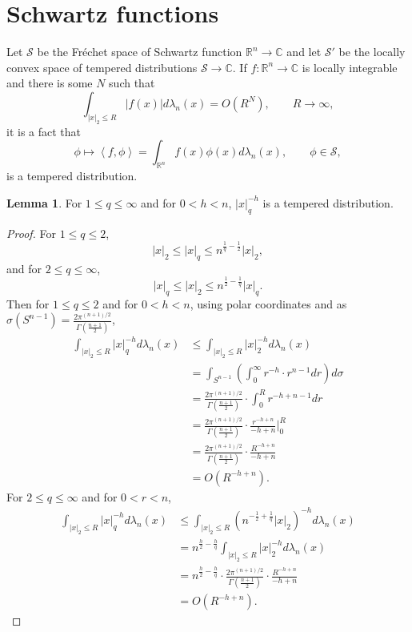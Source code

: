 \documentclass{article}
\newcommand{\inner}[2]{\left\langle #1, #2 \right\rangle}
\theoremstyle{definition}
\newtheorem{lemma}[theorem]{Lemma}
\theoremstyle{definition}
\begin{document}
\section{Schwartz functions}
Let $\mathscr{S}$ be the Fr\'echet space of Schwartz function $\mathbb{R}^n \to \mathbb{C}$ and let
$\mathscr{S}'$ be the locally convex space of tempered distributions $\mathscr{S} \to \mathbb{C}$. 
If $f:\mathbb{R}^n \to \mathbb{C}$ is locally integrable and there is some $N$ such that
\[
\int_{|x|_2 \leq R} |f(x)| d\lambda_n(x) = O(R^N),\qquad R \to \infty,
\]
it is a fact that
\[
\phi \mapsto \inner{f}{\phi} = \int_{\mathbb{R}^n} f(x) \phi(x) d\lambda_n(x),\qquad \phi \in \mathscr{S},
\]
is a tempered distribution. 

\begin{lemma}
For $1 \leq q \leq \infty$ and for $0<h<n$, 
$|x|_q^{-h}$ is a tempered distribution. 
\end{lemma}
\begin{proof}
For $1 \leq q \leq 2$, 
\[
|x|_2 \leq |x|_q \leq n^{\frac{1}{q}-\frac{1}{2}} |x|_2,
\]
and for $2 \leq q \leq \infty$,
\[
|x|_q \leq |x|_2 \leq n^{\frac{1}{2}-\frac{1}{q}} |x|_q.
\]
Then
for $1 \leq q \leq 2$ and for $0<h<n$, using polar coordinates and as $\sigma(S^{n-1}) = \frac{2\pi^{(n+1)/2}}{\Gamma(\frac{n+1}{2})}$,
\begin{align*}
\int_{|x|_2 \leq R} |x|_q^{-h} d\lambda_n(x)&\leq \int_{|x|_2 \leq R} |x|_2^{-h} d\lambda_n(x)\\
&=\int_{S^{n-1}} \left( \int_0^\infty r^{-h} \cdot r^{n-1} dr \right) d\sigma\\
&=\frac{2\pi^{(n+1)/2}}{\Gamma(\frac{n+1}{2})} \cdot \int_0^R r^{-h+n-1} dr \\
&=\frac{2\pi^{(n+1)/2}}{\Gamma(\frac{n+1}{2})} \cdot \frac{r^{-h+n}}{-h+n} \bigg|_0^R\\
&=\frac{2\pi^{(n+1)/2}}{\Gamma(\frac{n+1}{2})} \cdot \frac{R^{-h+n}}{-h+n}\\
&=O(R^{-h+n}).
\end{align*}
For $2 \leq q \leq \infty$ and for $0<r<n$, 
\begin{align*}
\int_{|x|_2 \leq R} |x|_q^{-h} d\lambda_n(x)&\leq \int_{|x|_2 \leq R} (n^{-\frac{1}{2}+\frac{1}{q}} |x|_2)^{-h} d\lambda_n(x)\\
&=n^{\frac{h}{2} - \frac{h}{q}} \int_{|x|_2 \leq R} |x|_2^{-h} d\lambda_n(x)\\
&=n^{\frac{h}{2} - \frac{h}{q}}  \cdot \frac{2\pi^{(n+1)/2}}{\Gamma(\frac{n+1}{2})} \cdot \frac{R^{-h+n}}{-h+n}\\
&=O(R^{-h+n}).
\end{align*}
\end{proof}
\end{document}
